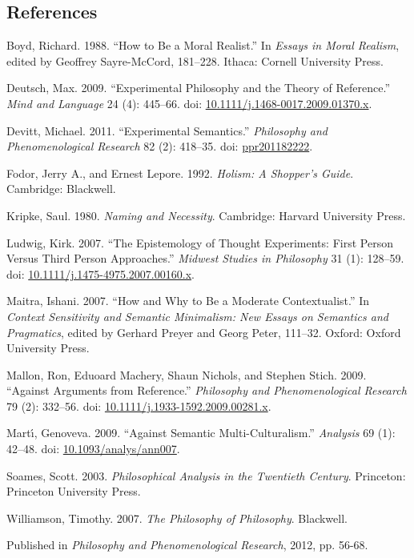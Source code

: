 \documentclass[
  10pt,
  letterpaper,
  DIV=11,
  numbers=noendperiod,
  twoside]{scrartcl}
\newlength{\cslhangindent}
\newenvironment{CSLReferences}[2] %
 {\begin{list}{}{%
  \setlength{\itemindent}{0pt}
  \setlength{\leftmargin}{0pt}
  \setlength{\parsep}{0pt}
  \ifodd #1
   \setlength{\leftmargin}{\cslhangindent}
   \setlength{\itemindent}{-1\cslhangindent}
  \fi
  \setlength{\itemsep}{#2\baselineskip}}}
 {\end{list}}
\begin{document}
\subsection*{References}\label{references}

\label{refs}
\begin{CSLReferences}{1}{0}
Boyd, Richard. 1988. {``How to Be a Moral Realist.''} In \emph{Essays in
Moral Realism}, edited by Geoffrey Sayre-McCord, 181--228. Ithaca:
Cornell University Press.

Deutsch, Max. 2009. {``Experimental Philosophy and the Theory of
Reference.''} \emph{Mind and Language} 24 (4): 445--66. doi:
\href{https://doi.org/10.1111/j.1468-0017.2009.01370.x}{10.1111/j.1468-0017.2009.01370.x}.

Devitt, Michael. 2011. {``Experimental Semantics.''} \emph{Philosophy
and Phenomenological Research} 82 (2): 418--35. doi:
\href{https://doi.org/ppr201182222}{ppr201182222}.

Fodor, Jerry A., and Ernest Lepore. 1992. \emph{Holism: A Shopper's
Guide}. Cambridge: Blackwell.

Kripke, Saul. 1980. \emph{Naming and Necessity}. Cambridge: Harvard
University Press.

Ludwig, Kirk. 2007. {``The Epistemology of Thought Experiments: First
Person Versus Third Person Approaches.''} \emph{Midwest Studies in
Philosophy} 31 (1): 128--59. doi:
\href{https://doi.org/10.1111/j.1475-4975.2007.00160.x}{10.1111/j.1475-4975.2007.00160.x}.

Maitra, Ishani. 2007. {``How and Why to Be a Moderate Contextualist.''}
In \emph{Context Sensitivity and Semantic Minimalism: New Essays on
Semantics and Pragmatics}, edited by Gerhard Preyer and Georg Peter,
111--32. Oxford: Oxford University Press.

Mallon, Ron, Eduoard Machery, Shaun Nichols, and Stephen Stich. 2009.
{``Against Arguments from Reference.''} \emph{Philosophy and
Phenomenological Research} 79 (2): 332--56. doi:
\href{https://doi.org/10.1111/j.1933-1592.2009.00281.x}{10.1111/j.1933-1592.2009.00281.x}.

Martı́, Genoveva. 2009. {``Against Semantic Multi-Culturalism.''}
\emph{Analysis} 69 (1): 42--48. doi:
\href{https://doi.org/10.1093/analys/ann007}{10.1093/analys/ann007}.

Soames, Scott. 2003. \emph{Philosophical Analysis in the Twentieth
Century}. Princeton: Princeton University Press.

Williamson, Timothy. 2007. \emph{{The Philosophy of Philosophy}}.
Blackwell.

\end{CSLReferences}



\noindent Published in\emph{
Philosophy and Phenomenological Research}, 2012, pp. 56-68.
\end{document}
